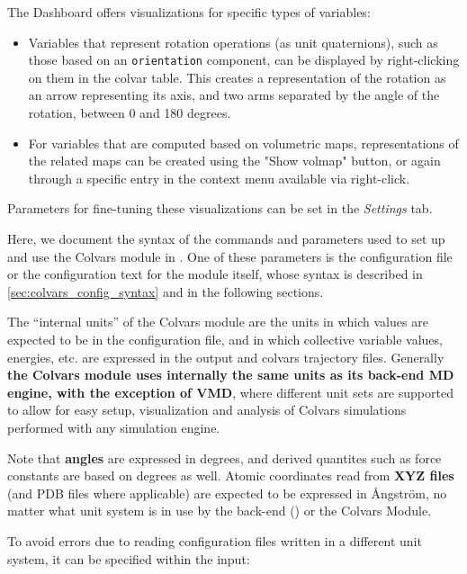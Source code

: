 {The Dashboard offers visualizations for specific types of variables:
\begin{itemize}
  \item Variables that represent rotation operations (as unit quaternions), such as those based on an \texttt{orientation} component, can be displayed by right-clicking on them in the colvar table.
  This creates a representation of the rotation as an arrow representing its axis, and two arms separated by the angle of the rotation, between 0 and 180 degrees.
  \item For variables that are computed based on volumetric maps, representations of the related maps can be created using the "Show volmap" button, or again through a specific entry in the context menu available via right-click.
\end{itemize}
Parameters for fine-tuning these visualizations can be set in the \textit{Settings} tab.


} %


Here, we document the syntax of the commands and parameters used to set up and use the Colvars module in \MDENGINE{}.
One of these parameters is the configuration file or the configuration text for the module itself, whose syntax is described in \ref{sec:colvars_config_syntax} and in the following sections.


The ``internal units'' of the Colvars module are the units in which values are expected to be in the configuration file, and in which collective variable values, energies, etc. are expressed in the output and colvars trajectory files.
Generally \textbf{the Colvars module uses internally the same units as its back-end MD engine, with the exception of VMD}, where different unit sets are supported to allow for easy setup, visualization and analysis of Colvars simulations performed with any simulation engine.

Note that \textbf{angles} are expressed in degrees, and derived quantites such as force constants are based on degrees as well.
Atomic coordinates read from \textbf{XYZ files} (and PDB files where applicable) are expected to be expressed in \AA{}ngstr\"om, no matter what unit system is in use by the back-end (\MDENGINE) or the Colvars Module.

To avoid errors due to reading configuration files written in a different unit system, it can be specified within the input:

